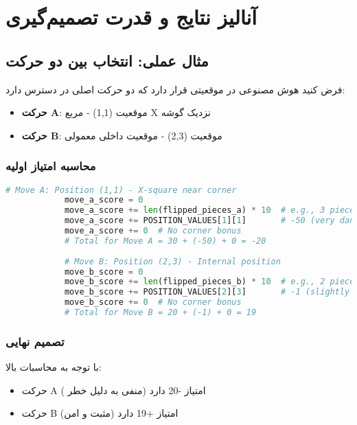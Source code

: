 \documentclass[12pt]{article}
\newenvironment{ltrcode}{\lr\bgroup}{\egroup}
\begin{document}
	\section{آنالیز نتایج و قدرت تصمیم‌گیری}
	
	\subsection{مثال عملی: انتخاب بین دو حرکت}
	
	فرض کنید هوش مصنوعی در موقعیتی قرار دارد که دو حرکت اصلی در دسترس دارد:
	
	\begin{itemize}
		\item \textbf{حرکت A}: موقعیت (1,1) - مربع X نزدیک گوشه
		\item \textbf{حرکت B}: موقعیت (2,3) - موقعیت داخلی معمولی
	\end{itemize}
	
	\subsubsection{محاسبه امتیاز اولیه}
	
	\begin{ltrcode}
		\begin{lstlisting}[language=Python, caption=Example Move Evaluation Calculation]
			# Move A: Position (1,1) - X-square near corner
			move_a_score = 0
			move_a_score += len(flipped_pieces_a) * 10  # e.g., 3 pieces * 10 = 30
			move_a_score += POSITION_VALUES[1][1]       # -50 (very dangerous)
			move_a_score += 0  # No corner bonus
			# Total for Move A = 30 + (-50) + 0 = -20
			
			# Move B: Position (2,3) - Internal position  
			move_b_score = 0
			move_b_score += len(flipped_pieces_b) * 10  # e.g., 2 pieces * 10 = 20
			move_b_score += POSITION_VALUES[2][3]       # -1 (slightly negative)
			move_b_score += 0  # No corner bonus
			# Total for Move B = 20 + (-1) + 0 = 19
		\end{lstlisting}
	\end{ltrcode}
	
	\subsubsection{تصمیم نهایی}
	
	با توجه به محاسبات بالا:
	
	\begin{itemize}
		\item حرکت A امتیاز -20 دارد (منفی به دلیل خطر )
		\item حرکت B امتیاز +19 دارد (مثبت و امن)
	\end{itemize}
	
\end{document}
